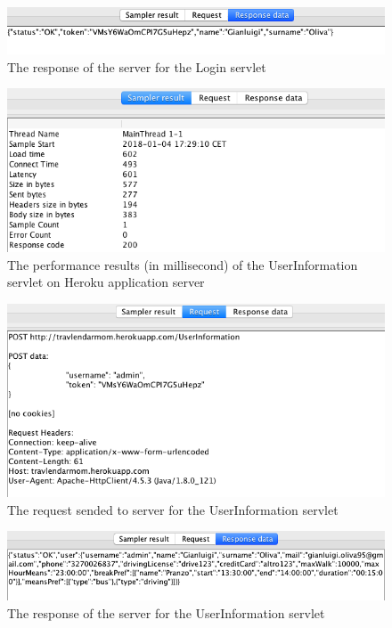 \documentclass[numbers=noenddot, 12pt, a4paper, oneside]{scrbook}
\begin{document}
\begin{figure}[H]
\centering
\includegraphics[width=1.1\textwidth]{Test/LoginResp}
\caption{The response of the server for the Login servlet}
\end{figure}

\begin{figure}[H]
	\centering
	\includegraphics[width=1.1\textwidth]{Test/UserInformationMain}
	\caption{The performance results (in millisecond) of the UserInformation servlet on Heroku application server}
\end{figure}

\begin{figure}[H]
	\centering
	\includegraphics[width=1.1\textwidth]{Test/UserInformationReq}
	\caption{The request sended to server for the UserInformation servlet}
\end{figure}

\begin{figure}[H]
	\centering
	\includegraphics[width=1.1\textwidth]{Test/UserInformationResp}
	\caption{The response of the server for the UserInformation servlet}
\end{figure}
\end{document}
